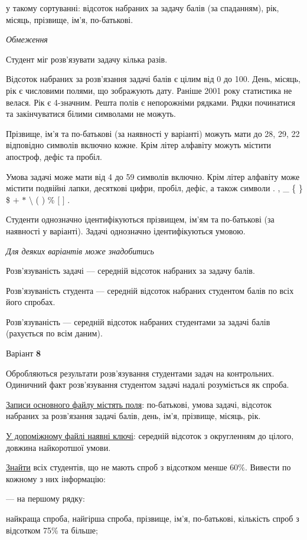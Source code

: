 \documentclass[11pt, ukrainian]{article}
\begin{document}
{\noindent}у такому сортуванні: відсоток набраних за задачу балів (за спаданням), рік, місяць, прізвище, ім’я, по-батькові.


\bigskip\textit{Обмеження}

Студент міг розв’язувати задачу кілька разів.

Відсоток набраних за розв’язання задачі балів є цілим від 0 до 100.
День, місяць, рік є числовими полями, що зображують дату.
Раніше 2001 року статистика не велася. Рік є 4-значним.
Решта полів є непорожніми рядками.
Рядки починатися та закінчуватися білими символами не можуть.

Прізвище, ім’я та по-батькові (за наявності у варіанті) можуть мати до 28, 29, 22 відповідно символів включно кожне. 
Крім літер алфавіту можуть містити апостроф, дефіс та пробіл.

Умова задачі може мати від 4 до 59 символів включно.
Крім літер алфавіту може містити подвійні лапки, десяткові цифри, пробіл, дефіс,
а також символи . , \_ \{ \} \$ $+$ $*$ {\textbackslash} ( ) \% $[$ $]$ .

Студенти однозначно ідентифікуються прізвищем, ім’ям та по-батькові (за наявності у варіанті).
Задачі однозначно ідентифікуються умовою.

\bigskip\textit{Для деяких варіантів може знадобитись}

Розв'язуваність задачі --- середній відсоток набраних за задачу балів.

Розв'язуваність студента --- середній відсоток набраних студентом балів по всіх його спробах.

Розв'язуваність --- середній відсоток набраних студентами за задачі балів (рахується по всім даним).


\par
\newpage
{\center Варіант  \No \textbf { 8 }\par}
\bigskip
Обробляються результати розв’язування студентами задач на контрольних.
Одиничний факт роз\-в’я\-зу\-вання студентом задачі надалі розуміється як спроба.

\underline{Записи основного файлу містять поля}: по-батькові, умова задачі, відсоток набраних за розв’язання задачі балів, день, ім’я, прізвище, місяць, рік.

\underline{У допоміжному файлі наявні ключі}: середній відсоток з округленням до цілого, довжина найкоротшої умови.

\underline{Знайти} всіх студентів, що не мають спроб з відсотком менше 60\%. Вивести по кожному з них інформацію:\par
{\noindent}--- на першому рядку:\par
найкраща спроба, найгірша спроба, прізвище, ім’я, по-батькові, кількість спроб з відсотком 75\% та більше;
\end{document}
